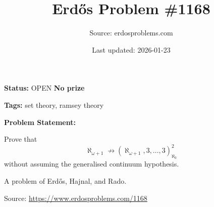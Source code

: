 \documentclass{article}
\title{Erd\H{o}s Problem \#1168}
\date{Last updated: 2026-01-23}
\author{Source: erdosproblems.com}
\begin{document}
\maketitle

\noindent\textbf{Status:} OPEN \quad \textbf{No prize}

\noindent\textbf{Tags:} set theory, ramsey theory

\medskip

\noindent\textbf{Problem Statement:}

Prove that\[\aleph_{\omega+1}\not\to (\aleph_{\omega+1}, 3,\ldots,3)_{\aleph_0}^2\]without assuming the generalised continuum hypothesis.




A problem of Erd\H{o}s, Hajnal, and Rado.


\bigskip
\noindent\small{Source: \url{https://www.erdosproblems.com/1168}}
\end{document}
